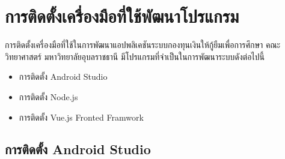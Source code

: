 \chapter{การติดตั้งเครื่องมือที่ใช้พัฒนาโปรแกรม}
การติดตั้งเครื่องมือที่ใช้ในการพัฒนาแอปพลิเคชันระบบกองทุนเงินให้กู้ยืมเพื่อการศึกษา คณะวิทยาศาสตร์ มหาวิทยาลัยอุบลราชธานี มีโปรแกรมที่จำเป็นในการพัฒนาระบบดังต่อไปนี้
\begin{itemize}
	\item การติดตั้ง Android Studio
	\item การติดตั้ง Node.js
	\item การติดตั้ง Vue.js Fronted Framwork
\end{itemize}

\section{การติดตั้ง Android Studio}
